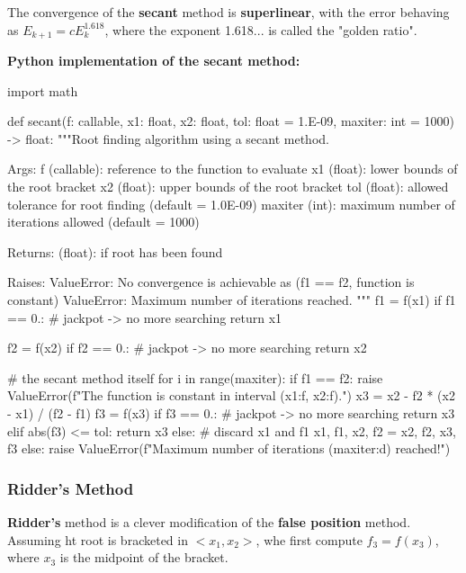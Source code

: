 The convergence of the \textbf{secant} method is \textbf{superlinear}, with the
error behaving as $ E_{k+1} = c E_{k}^{1.618} $, where the exponent 1.618... is called
the "golden ratio".

\newpage
\textbf{Python implementation of the secant method:}

\begin{python}
import math

def secant(f: callable, x1: float, x2: float,
           tol: float = 1.E-09, maxiter: int = 1000) -> float:
    """Root finding algorithm using a secant method.

    Args:
        f (callable):  reference to the function to evaluate
        x1 (float):    lower bounds of the root bracket
        x2 (float):    upper bounds of the root bracket
        tol (float):   allowed tolerance for root finding
                       (default = 1.0E-09)
        maxiter (int): maximum number of iterations allowed (default = 1000)

    Returns:
        (float): if root has been found

    Raises:
        ValueError: No convergence is achievable as (f1 == f2, function is constant)
        ValueError: Maximum number of iterations reached.
    """
    f1 = f(x1)
    if f1 == 0.: # jackpot -> no more searching
        return x1

    f2 = f(x2)
    if f2 == 0.: # jackpot -> no more searching
        return x2

    # the secant method itself
    for i in range(maxiter):
        if f1 == f2:
            raise ValueError(f"The function is constant in interval ({x1:f}, {x2:f}).")
        x3 = x2 - f2 * (x2 - x1) / (f2 - f1)
        f3 = f(x3)
        if f3 == 0.: # jackpot -> no more searching
            return x3
        elif abs(f3) <= tol:
            return x3
        else:
            # discard x1 and f1
            x1, f1, x2, f2 = x2, f2, x3, f3
    else:
        raise ValueError(f"Maximum number of iterations ({maxiter:d}) reached!")


\end{python}


\newpage
\subsubsection{Ridder's Method}

\textbf{Ridder's} method is a clever modification of the \textbf{false position}
method. Assuming ht root is bracketed in $ <x_1, x_2> $, whe first compute
$ f_3 = f(x_3) $, where $ x_3 $ is the midpoint of the bracket.

